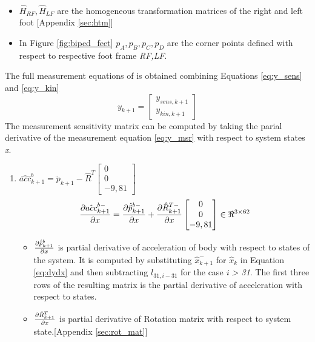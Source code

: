 \begin{enumerate}
\begin{equation}
\begin{split}
    \end{split}
\end{equation}
\begin{itemize}
\item $\hat{H}_{RF},\hat{H}_{LF}$ are the homogeneous transformation matrices of the right and left foot [Appendix \ref{sec:htm}]
\item In Figure \ref{fig:biped_feet} $p_A,p_B,p_C,p_D$ are the corner points defined with respect to respective foot frame \emph{RF,LF}.
\end{itemize}
The full measurement equations of is obtained combining Equations \ref{eq:y_sens} and \ref{eq:y_kin} 
\begin{equation}
    \label{eq:y_msr}
    y_{k+1} = \begin{bmatrix} y_{sens,k+1} \\ y_{kin,k+1} \end{bmatrix}
\end{equation}
The measurement sensitivity matrix can be computed by taking the parial derivative of the measurement equation \ref{eq:y_msr} with respect to system states \emph{x}.
\begin{enumerate}
\item $\hat{acc}^b_{k+1} = \ddot{p}_{k+1}-\hat{R}^T\begin{bmatrix} 0 \\ 0 \\ -9,81 \end{bmatrix}$
\begin{equation}
    \label{eq:dacc_msrdx}
    \frac{\partial {\hat{acc}_{k+1}^{b-}}}{\partial {x}} = \frac{\partial {\hat{\ddot{p}}_{k+1}^{b-}}}{\partial {x}} + \frac{\partial {\hat{R}^{T-}_{k+1}}}{\partial {x}}\begin{bmatrix} 0 \\ 0 \\ -9,81 \end{bmatrix}  \in \Re^{3 \times 62}
\end{equation}
\begin{itemize}
    \item $\frac{\partial {\hat{\ddot{p}}_{k+1}^b}}{\partial {x}}$ is partial derivative of acceleration of body with respect to states of the system. It is computed by substituting $\hat{x}_{k+1}^-$ for $\hat{x}_k$ in Equation \ref{eq:dydx} and then subtracting  $l_{31,i-31}$ for the case \emph{i > 31}. The first three rows of the resulting matrix is the partial derivative of acceleration with respect to states.
    \item $\frac{\partial {\hat{R}^T_{k+1}}}{\partial {x}}$ is partial derivative of Rotation matrix with respect to system state.[Appendix \ref{sec:rot_mat}]
\end{itemize}


\end{enumerate}
\end{enumerate}
